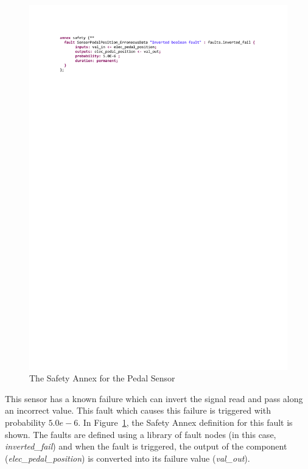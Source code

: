 \begin{figure}[h!]
	\hspace*{-2cm}
	\begin{center}
		\includegraphics[trim=0 690 -10 70,clip,width=1.5\dimexpr\textwidth-2cm\relax]{images/safetyannex_sensorfault.pdf}
		\caption{The Safety Annex for the Pedal Sensor}
		\label{fig:sensorFault}
	\end{center}
	\vspace{-0.3in}
\end{figure}

This sensor has a known failure which can invert the signal read and pass along an incorrect value. This fault which causes this failure is triggered with probability $5.0e-6$. In Figure~\ref{fig:sensorFault}, the Safety Annex definition for this fault is shown. The faults are defined using a library of fault nodes (in this case, \textit{inverted\_fail}) and when the fault is triggered, the output of the component (\textit{elec\_pedal\_position}) is converted into its failure value (\textit{val\_out}).  


